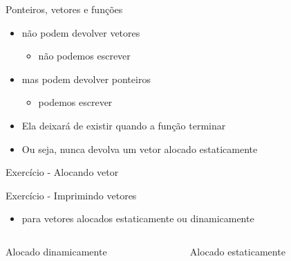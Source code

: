 \documentclass{beamer}
\begin{document}
\begin{frame}[<+->]{Ponteiros, vetores e funções}
  \begin{itemize}
    \item não podem devolver vetores
      \begin{itemize}
        \item não podemos escrever 
      \end{itemize}
    \item mas podem devolver ponteiros
      \begin{itemize}
        \item podemos escrever 
      \end{itemize}
  \end{itemize}

  \bigskip
  \bigskip

  \begin{itemize}
    \item Ela deixará de existir quando a função terminar
    \item Ou seja, nunca devolva um vetor alocado estaticamente
  \end{itemize}

\end{frame}

\begin{frame}[<+->]{Exercício - Alocando vetor}

  \bigskip
  \bigskip

  \action{}

\end{frame}

\begin{frame}[<+->]{Exercício - Imprimindo vetores}
  \begin{itemize}
    \item para vetores alocados estaticamente ou dinamicamente
  \end{itemize}

  \bigskip
  \bigskip

  \action{}

  \bigskip

  \begin{columns}
    \begin{column}[t]{0.5\linewidth}
      Alocado dinamicamente
      \action{}
    \end{column}
    \begin{column}[t]{0.5\linewidth}
      Alocado estaticamente
      \action{}
    \end{column}
  \end{columns}
\end{frame}
\end{document}
